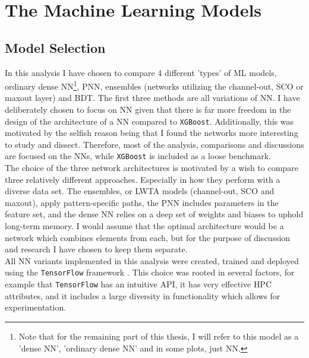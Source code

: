 \section{The Machine Learning Models}
\subsection{Model Selection}
In this analysis I have chosen to compare 4 different 'types' of \ac{ML} models, ordinary dense \acf{NN}\footnote{Note 
that for the remaining part of this thesis, I will refer to this model as a 'dense \ac{NN}', 'ordinary dense \ac{NN}' 
and in some plots, just \ac{NN}.}, \acf{PNN}, ensembles (networks utilizing the channel-out, \ac{SCO} or maxout layer) 
and \acf{BDT}. The first three methods are all variations of \ac{NN}. I have deliberately 
chosen to focus on \ac{NN} given that there is far more freedom in the design of the architecture
of a \ac{NN} compared to \verb!XGBoost!. Additionally, this was motivated by the selfish reason
being that I found the networks more interesting to study and dissect. Therefore, most of the 
analysis, comparisons and discussions are focused on the \ac{NN}s, while \verb!XGBoost! is included 
as a loose benchmark. 
\\
The choice of the three network architectures is motivated by a wish to compare three relatively different approaches.
Especially in how they perform with a diverse data set. The ensembles, or \ac{LWTA} models (channel-out, \ac{SCO} and maxout), apply pattern-specific paths, 
the \ac{PNN} includes parameters in the feature set, and the dense \ac{NN} relies on a deep set of weights and biases to uphold long-term memory.
I would assume that the optimal architecture would be a network which combines elements from each, but for the purpose of discussion
and research I have chosen to keep them separate. 
\\
All \ac{NN} variants implemented in this analysis were created, trained and deployed using the \verb!TensorFlow! framework \cite{tensorflow}.
This choice was rooted in several factors, for example that \verb!TensorFlow! has an intuitive \ac{API}, it has very effective
\ac{HPC} attributes, and it includes a large diversity in functionality which allows for experimentation.
